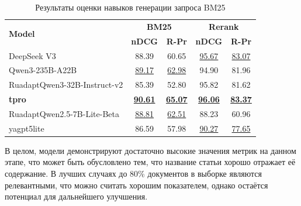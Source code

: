 \documentclass{article}
\begin{document}
\begin{table}[ht]
\centering
\caption{Результаты оценки навыков генерации запроса BM25}
\begin{tabular}{l|cc|cc}
\hline
\multirow{2}{*}{\textbf{Model}} & \multicolumn{2}{c|}{\textbf{BM25}} & \multicolumn{2}{c}{\textbf{Rerank}} \\
 & \textbf{nDCG} & \textbf{R-Pr} & \textbf{nDCG} & \textbf{R-Pr} \\
\hline
DeepSeek V3                                         & 88.39 & 60.65 & \uline{95.67} & \uline{83.07} \\
Qwen3-235B-A22B                                     & \uline{89.17} & \uline{62.98} & 94.90 & 81.96 \\
\hline
RuadaptQwen3-32B-Instruct-v2                        & 85.39 & 52.80 & 95.82 & 81.62 \\
\textbf{tpro}                                       & \uline{\textbf{90.61}} & \uline{\textbf{65.07}} & \uline{\textbf{96.06}} & \uline{\textbf{83.37}} \\
\hline
RuadaptQwen2.5-7B-\allowbreak Lite-\allowbreak Beta & \uline{88.81} & \uline{62.51} & 88.23 & 60.96 \\
yagpt5lite                                          & 86.59 & 57.98 & \uline{90.27} & \uline{77.65} \\
\hline
\end{tabular}
\label{tab:query_def}
\end{table}

В целом, модели демонстрируют достаточно высокие значения метрик на данном этапе, что может быть обусловлено тем, что название статьи хорошо отражает её содержание. 
В лучших случаях до 80\% документов в выборке являются релевантными, что можно считать хорошим показателем, однако остаётся потенциал для дальнейшего улучшения.
\end{document}
